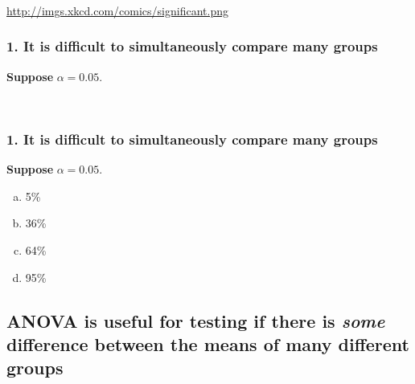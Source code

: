 \documentclass[11pt,containsverbatim,handout,xcolor=xelatex,dvipsnames,table]{beamer}
\newcommand{\solnMult}[1]{#1}
\newcommand{\soln}[1]{}
\begin{document}

\begin{frame}
\frametitle{}

\vfill
  
\begin{center}
\url{http://imgs.xkcd.com/comics/significant.png}
\end{center}

\end{frame}


\begin{frame}
\frametitle{1. It is difficult to simultaneously compare many groups}

\textbf{Suppose} $\alpha = 0.05$.


$\:$ \\

\pause

\soln{P(Type 1 Error) = 0.05}

\end{frame}


\begin{frame}
\frametitle{1. It is difficult to simultaneously compare many groups}

\textbf{Suppose} $\alpha = 0.05$.

\begin{enumerate}[(a)]
\item 5\%
\item 36\%
\item \solnMult{64\%} \only<2>{\soln{\red{$\rightarrow$ $1 - 0.95^{20} \approx 0.64$}}}
\item 95\%
\end{enumerate}

\end{frame}


\subsection{ANOVA is useful for testing if there is \emph{some} difference
between the means of many different groups}
\label{mi2}
\end{document}
